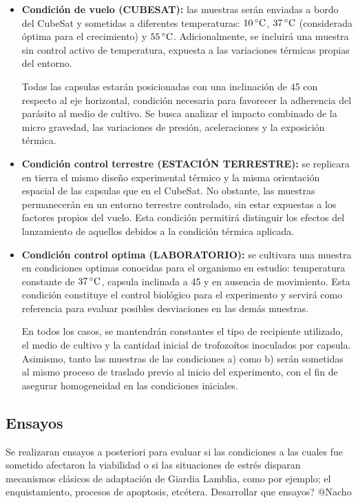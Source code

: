     \begin{itemize}
      \item \textbf{Condición de vuelo (CUBESAT):} las muestras serán enviadas a bordo del CubeSat y
      sometidas a diferentes temperaturas: $10\,^\circ\mathrm{C}$, $37\,^\circ\mathrm{C}$ (considerada óptima para el
      crecimiento) y $55\,^\circ\mathrm{C}$. Adicionalmente, se incluirá una muestra sin control activo de temperatura,
      expuesta a las variaciones térmicas propias del entorno.

      Todas las capsulas estarán posicionadas con una inclinación de 45 con respecto al eje horizontal, condición
      necesaria para favorecer la adherencia del parásito al medio de cultivo. Se busca analizar el
      impacto combinado de la micro gravedad, las variaciones de presión, aceleraciones
      y la exposición térmica.

      \item \textbf{Condición control terrestre (ESTACIÓN TERRESTRE):} se replicara en tierra
      el mismo diseño experimental térmico y la misma orientación espacial de las capsulas
      que en el CubeSat. No obstante, las muestras permanecerán en un entorno terrestre
      controlado, sin estar expuestas a los factores propios del vuelo. Esta condición permitirá
      distinguir los efectos del lanzamiento de aquellos debidos a la condición térmica
      aplicada.

      \item \textbf{Condición control optima (LABORATORIO):} se cultivara una muestra en condiciones optimas
      conocidas para el organismo en estudio: temperatura constante de
      $37\,^\circ\mathrm{C}$, capsula inclinada a 45 y en ausencia de movimiento. Esta condición constituye
      el control biológico para el experimento y servirá como referencia para evaluar posibles
      desviaciones en las demás muestras.

      En todos los casos, se mantendrán constantes el tipo de recipiente utilizado, el medio de cultivo y la cantidad
      inicial de trofozoítos inoculados por
      capsula. Asimismo, tanto las muestras de las condiciones a) como b) serán sometidas al mismo
      proceso de traslado previo al inicio del experimento, con el fin de asegurar homogeneidad en
      las condiciones iniciales.
    \end{itemize}

  \subsection{Ensayos}
    Se realizaran ensayos a posteriori para evaluar si las condiciones a las cuales fue sometido afectaron la viabilidad o si las situaciones de estrés disparan mecanismos clásicos de
    adaptación de Giardia Lamblia, como por ejemplo; el enquistamiento, procesos de apoptosis,
    etcétera. Desarrollar que ensayos? @Nacho

